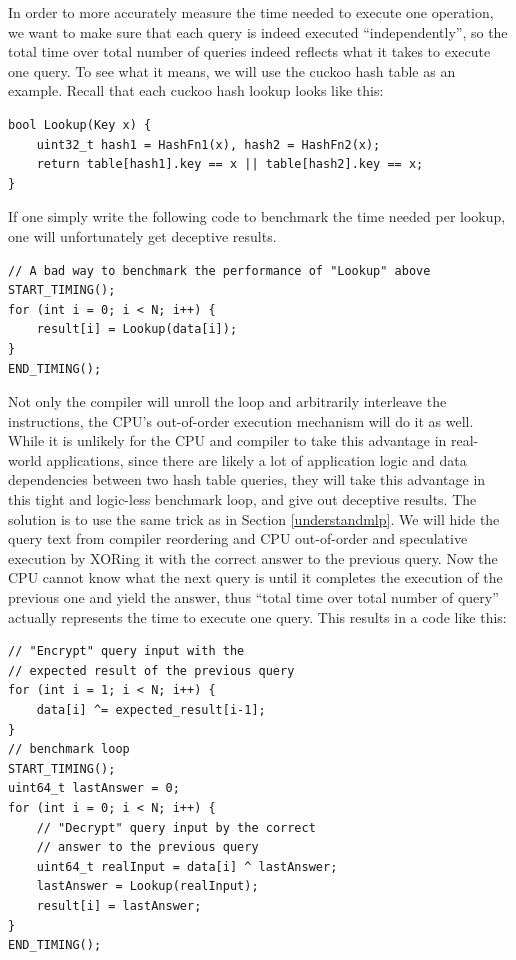 \documentclass[11pt, usletter]{article}
\begin{document}
In order to more accurately measure the time needed to execute one operation, 
we want to make sure that each query is indeed executed ``independently'', 
so the total time over total number of queries indeed reflects what it takes to execute one query. 
To see what it means, we will use the cuckoo hash table as an example. 
Recall that each cuckoo hash lookup looks like this:

\singlespacing\begin{codebox}
\begin{verbatim}
bool Lookup(Key x) {
    uint32_t hash1 = HashFn1(x), hash2 = HashFn2(x);
    return table[hash1].key == x || table[hash2].key == x;
}
\end{verbatim}
\end{codebox}\doublespacing

If one simply write the following code to benchmark the time needed per lookup, 
one will unfortunately get deceptive results.

\singlespacing\begin{codebox}
\begin{verbatim}
// A bad way to benchmark the performance of "Lookup" above
START_TIMING();
for (int i = 0; i < N; i++) { 
    result[i] = Lookup(data[i]);
}
END_TIMING();
\end{verbatim}
\end{codebox}\doublespacing

Not only the compiler will unroll the loop and arbitrarily interleave the instructions, 
the CPU's out-of-order execution mechanism will do it as well. 
While it is unlikely for the CPU and compiler to take this advantage in real-world applications, 
since there are likely a lot of application logic and data dependencies between two hash table queries, 
they will take this advantage in this tight and logic-less benchmark loop, and give out deceptive results. 
The solution is to use the same trick as in Section \ref{understandmlp}. 
We will hide the query text from compiler reordering and CPU out-of-order and speculative execution by 
XORing it with the correct answer to the previous query. 
Now the CPU cannot know what the next query is until it completes the execution of the previous one and yield the answer, 
thus ``total time over total number of query'' actually represents the time to execute one query. 
This results in a code like this:

\singlespacing\begin{codebox}
\begin{verbatim}
// "Encrypt" query input with the 
// expected result of the previous query
for (int i = 1; i < N; i++) {
    data[i] ^= expected_result[i-1];
}
// benchmark loop
START_TIMING();
uint64_t lastAnswer = 0;
for (int i = 0; i < N; i++) { 
    // "Decrypt" query input by the correct 
    // answer to the previous query 
    uint64_t realInput = data[i] ^ lastAnswer;
    lastAnswer = Lookup(realInput);
    result[i] = lastAnswer;
}
END_TIMING();
\end{verbatim}
\end{codebox}\doublespacing
\end{document}
